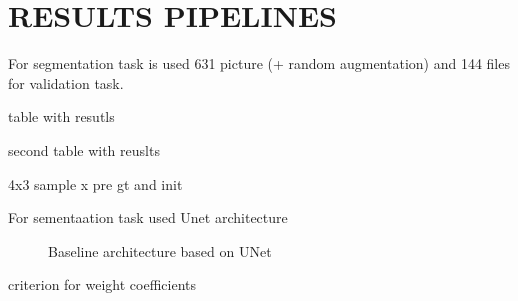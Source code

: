 \section{RESULTS PIPELINES}
\label{RESULTS PIPELINES}

For segmentation task is used 631 picture (+ random augmentation) and 144 files for validation task.

table with resutls 

second table with reuslts 

4x3 sample x pre gt and init

For sementaation task used Unet architecture

\begin{figure}[ht]
	\caption{Baseline architecture based on UNet}
	\label{ris:aug_example}
\end{figure}

criterion for weight coefficients 